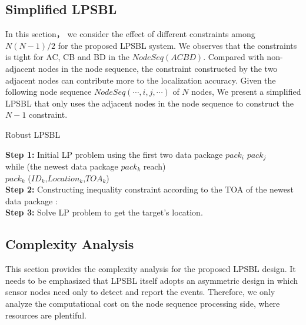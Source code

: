  
 \subsection{Simplified LPSBL}
 
  
  In this section， we consider the effect of different constraints among $N(N - 1)/2$ for the proposed LPSBL system.     
  We observes that the constraints is tight for AC, CB and BD in the $NodeSeq (A C B D)$.  
  Compared with non-adjacent nodes in the node sequence, the constraint constructed by the two adjacent nodes can contribute more to the localization accuracy. 
  Given the following node sequence $NodeSeq( \cdots ,i,j, \cdots )$ of $N$ nodes, 
  We present a simplified LPSBL that only uses the adjacent nodes in the node sequence to construct the $N-1$ constraint.

 
\begin{algorithm}
\caption{Robust LPSBL}
 
 \textbf{Step 1:}  Initial LP problem using the first two data package $pack_i$ $pack_j$ \\
          while (the newest data package $pack_k$ reach)\\		 
		   $pack_k$ ($ID_k$,$Location_k$,$TOA_k$)\\
\textbf{Step 2:}  Constructing inequality constraint according to the TOA of the newest data package : \\ 

\textbf{Step 3:} Solve LP problem to get the target's location.\\
       
 
 \end{algorithm}
 
\subsection{Complexity Analysis}
This section provides the complexity analysis for the proposed
LPSBL design. It needs to be emphasized that
LPSBL itself adopts an asymmetric design in which sensor
nodes need only to detect and report the events. Therefore,
we only analyze the computational cost on the node sequence
processing side, where resources are plentiful.

